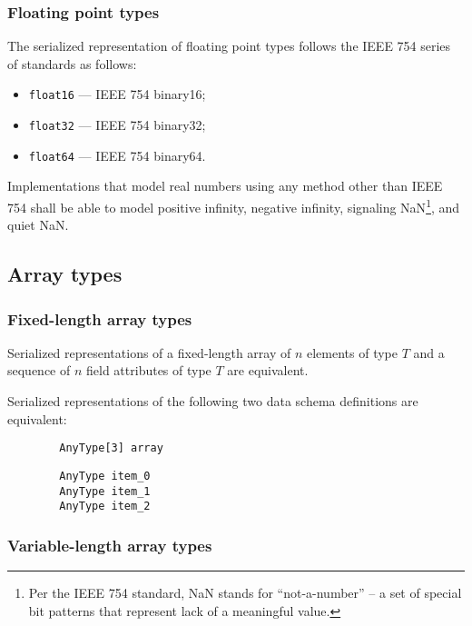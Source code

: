 \subsubsection{Floating point types}

The serialized representation of floating point types follows the IEEE 754 series of standards as follows:

\begin{itemize}
    \item \verb|float16| --- IEEE 754 binary16;
    \item \verb|float32| --- IEEE 754 binary32;
    \item \verb|float64| --- IEEE 754 binary64.
\end{itemize}

Implementations that model real numbers using any method other than IEEE 754 shall be able to model
positive infinity, negative infinity, signaling NaN\footnote{%
    Per the IEEE 754 standard, NaN stands for
    ``not-a-number'' -- a set of special bit patterns that represent lack of a meaningful value.
}, and quiet NaN.

\subsection{Array types}

\subsubsection{Fixed-length array types}

Serialized representations of a fixed-length array of $n$ elements of type $T$ and
a sequence of $n$ field attributes of type $T$ are equivalent.

\begin{remark}
    Serialized representations of the following two data schema definitions are equivalent:

    \begin{verbatim}
        AnyType[3] array
    \end{verbatim}

    \begin{verbatim}
        AnyType item_0
        AnyType item_1
        AnyType item_2
    \end{verbatim}
\end{remark}

\subsubsection{Variable-length array types}\label{sec:dsdl_serialized_variable_length_array}

